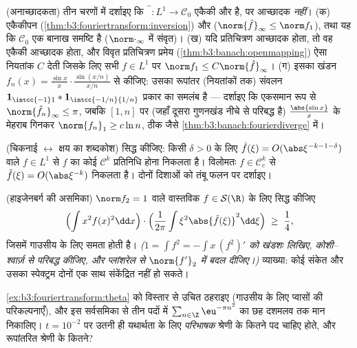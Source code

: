 \begin{exercise}[$\star\star\star$]\label{exo:b3:fouriertransform:6}
(अनाच्छादकता) तीन चरणों में दर्शाइए कि $\widehat{\phantom f}\colon L^1
\to \mathcal C_0$ एकैकी और  है, पर
आच्छादक \emph{नहीं}।
(क) एकैकीपन (\cref{thm:b3:fouriertransform:inversion}) और  ($\norm{\hat f}_\infty \leq \norm f_1$), तथा यह कि $\mathcal C_0$ एक बानाख
समष्टि है ($\norm\cdot_\infty$ में संवृत)।
(ख) यदि प्रतिचित्रण आच्छादक होता, तो वह एकैकी आच्छादक होता, और
विवृत प्रतिचित्रण प्रमेय (\cref{thm:b3:banach:openmapping}) ऐसा नियतांक $C$ देती जिसके लिए
सभी $f \in L^1$ पर $\norm f_1 \leq C\norm{\hat
f}_\infty$।
(ग) इसका खंडन $f_n(x) = \frac{\sin
x}{x}\cdot\frac{\sin(x/n)}{x/n}$ से कीजिए: उसका रूपांतर (नियतांकों तक) संवलन
$\mathbf 1_{\intcc{-1}1} *
\mathbf 1_{\intcc{-1/n}{1/n}}$ प्रकार का समलंब है --- दर्शाइए कि एकसमान रूप से $\norm{\hat f_n}_\infty \leq \pi$, जबकि
$[1, n]$ पर (जहाँ दूसरा गुणनखंड नीचे से परिबद्ध है) $\frac{\abs{\sin x}}x$ के मेहराब
गिनकर $\norm{f_n}_1 \geq c\ln n$, ठीक जैसे \cref{thm:b3:banach:fourierdiverge} में।
\end{exercise}

\begin{exercise}[$\star\star$]\label{exo:b3:fouriertransform:7}
(चिकनाई $\leftrightarrow$ क्षय का शब्दकोश) सिद्ध कीजिए: किसी $\delta > 0$ के लिए
$\hat f(\xi) = O(\abs\xi^{-k-1-\delta})$ वाले $f \in
L^1$ से $f$ का कोई $\mathcal C^k$ प्रतिनिधि होना निकलता है।
विलोमतः $f \in \mathcal C^k_c$ से $\hat f(\xi) =
O(\abs\xi^{-k})$ निकलता है। दोनों दिशाओं को तंबू फलन पर
दर्शाइए।
\end{exercise}

\begin{exercise}[$\star\star\star$]\label{exo:b3:fouriertransform:8}
(हाइजेनबर्ग की असमिका) $\norm f_2 = 1$ वाले वास्तविक $f \in \mathcal S(\R)$ के लिए सिद्ध
कीजिए
\[
\Bigl(\int x^2f(x)^2\dd x\Bigr)\cdot
\Bigl(\frac1{2\pi}\int \xi^2\abs{\hat f(\xi)}^2\dd\xi\Bigr)
\;\geq\; \frac14 ,
\]
जिसमें गाउसीय के लिए समता होती है। \emph{($1 = \int f^2 =
-\int x\,(f^2)'$ को खंडशः लिखिए,
कोशी--श्वार्ज़ से परिबद्ध कीजिए, और प्लांशरेल से $\norm{f'}_2$ में बदल
दीजिए।)} व्याख्या: कोई संकेत और उसका स्पेक्ट्रम दोनों एक साथ
संकेंद्रित नहीं हो सकते।
\end{exercise}

\begin{exercise}[$\star\star$]\label{exo:b3:fouriertransform:9}
\cref{ex:b3:fouriertransform:theta} को विस्तार से उचित ठहराइए (गाउसीय के लिए प्वासों की
परिकल्पनाएँ), और इस सर्वसमिका से तीन पदों में $\sum_{n\in\Z}\eu^{-\pi n^2}$ का छह दशमलव
तक मान निकालिए। $t = 10^{-2}$ पर उतनी ही यथार्थता के लिए
\emph{परिभाषक} श्रेणी के कितने पद चाहिए होते, और रूपांतरित श्रेणी
के कितने?
\end{exercise}


